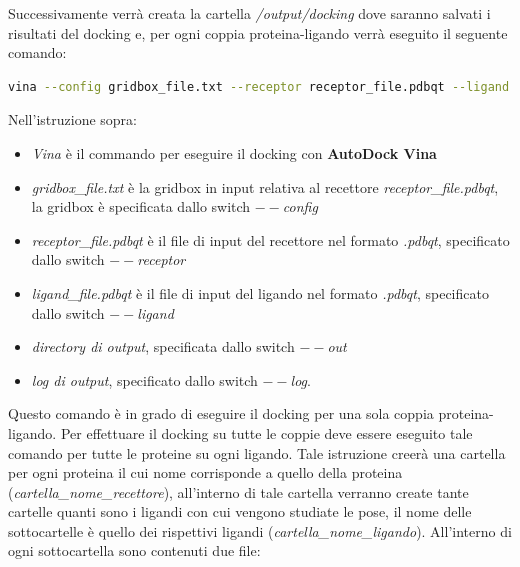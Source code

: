 Successivamente verrà creata la cartella \textit{/output/docking} dove saranno salvati i risultati del docking e, per ogni coppia proteina-ligando verrà eseguito il seguente comando:

\begin{lstlisting}[language=bash, label=lst:code30, caption={Comando per eseguire il docking con Autodock Vina}]
vina --config gridbox_file.txt --receptor receptor_file.pdbqt --ligand ligand_file.pdbqt --out "{percorso_directory_software_installato}/output/docking/vina/cartella_nome_recettore/cartella_nome_ligando/out.pdbqt" --log "{percorso_directory_software_installato}/output/docking/vina/cartella_nome_recettore/cartella_nome_ligando/log.txt"
\end{lstlisting}

Nell'istruzione sopra:

\begin{itemize}
    \item \textit{Vina} è il commando per eseguire il docking con \textbf{AutoDock Vina}
    \item \textit{gridbox\_file.txt} è la gridbox in input relativa al recettore \textit{receptor\_file.pdbqt}, la gridbox è specificata dallo switch \textit{$--$config}
    \item \textit{receptor\_file.pdbqt} è il file di input del recettore nel formato \textit{.pdbqt}, specificato dallo switch \textit{$--$receptor}
    \item \textit{ligand\_file.pdbqt} è il file di input del ligando nel formato \textit{.pdbqt}, specificato dallo switch \textit{$--$ligand}
    \item \textit{directory di output}, specificata dallo switch \textit{$--$out}
    \item \textit{log di output}, specificato dallo switch \textit{$--$log}.
\end{itemize}

Questo comando è in grado di eseguire il docking per una sola coppia proteina-ligando. Per effettuare il docking su tutte le coppie deve essere eseguito tale comando per tutte le proteine su ogni ligando. Tale istruzione creerà una cartella per ogni proteina il cui nome corrisponde a quello della proteina (\textit{cartella\_nome\_recettore}), all'interno di tale cartella verranno create tante cartelle quanti sono i ligandi con cui vengono studiate le pose, il nome delle sottocartelle è quello dei rispettivi ligandi (\textit{cartella\_nome\_ligando}). All'interno di ogni sottocartella sono contenuti due file:

